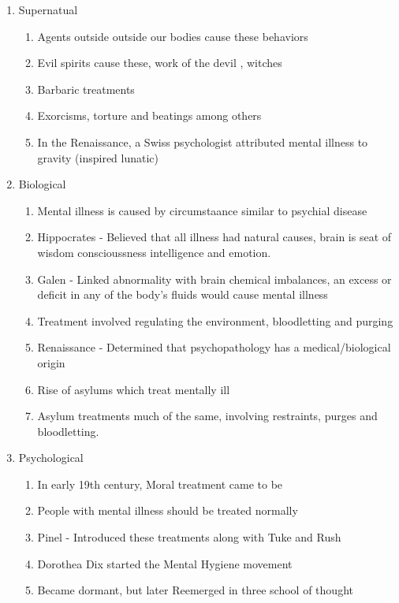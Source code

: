\documentclass[12pt]{article}
\begin{document}
\begin{enumerate}
\item Supernatual
  \begin{enumerate}
  \item Agents outside outside our bodies cause these behaviors
  \item Evil spirits cause these, work of the devil , witches
  \item Barbaric treatments
  \item Exorcisms, torture and beatings among others 
  \item In the Renaissance, a Swiss psychologist attributed mental
    illness to gravity (inspired lunatic)
  \end{enumerate}
\item Biological
  \begin{enumerate}
  \item Mental illness is caused by circumstaance similar to psychial disease
  \item Hippocrates - Believed that all illness had natural causes,
    brain is seat of wisdom conscioussness intelligence and emotion.
  \item Galen - Linked abnormality with brain chemical imbalances, an
    excess or deficit in any of the body's fluids would cause mental illness
  \item Treatment involved regulating the environment, bloodletting
    and purging
  \item Renaissance - Determined that psychopathology has a
    medical/biological origin
  \item Rise of asylums which treat mentally ill
  \item Asylum treatments much of the same, involving restraints,
    purges and bloodletting.
  \end{enumerate}
\item Psychological
  \begin{enumerate}
  \item In early 19th century, Moral treatment came to be
  \item People with mental illness should be treated normally
  \item Pinel - Introduced these treatments along with Tuke and Rush
  \item Dorothea Dix started the Mental Hygiene movement
  \item Became dormant, but later Reemerged in three school of thought
  \end{enumerate}
\end{enumerate}
\end{document}

